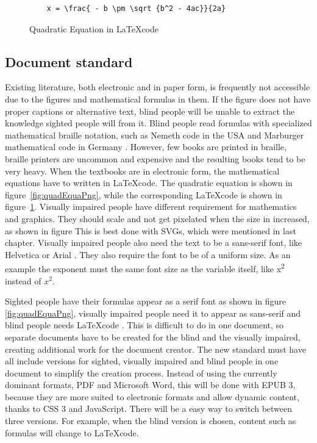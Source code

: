 \begin{figure}
	\begin{lstlisting}
	x = \frac{ - b \pm \sqrt {b^2 - 4ac}}{2a}
	\end{lstlisting}
	\caption{Quadratic Equation in \LaTeX code}
	\label{fig:quadEquaLatex}
\end{figure}


\subsection{Document standard}
Existing literature, both electronic and in paper form, is frequently not accessible due to the figures and mathematical formulas in them. If the figure does not have proper captions or alternative text, blind people will be unable to extract the knowledge sighted people will from it. Blind people read formulas with specialized mathematical braille notation, such as Nemeth code in the USA and Marburger mathematical code in Germany \cite{augenbitWiki}. However, few books are printed in braille, braille printers are uncommon and expensive and the resulting books tend to be very heavy. When the textbooks are in electronic form, the mathematical equations have to written in \LaTeX code. The quadratic equation is shown in figure~\ref{fig:quadEquaPng}, while the corresponding \LaTeX code is shown in figure~\ref{fig:quadEquaLatex}. Visually impaired people have different requirement for mathematics and graphics. They should scale and not get pixelated when the size in increased, as shown in figure This is best done with SVGs, which were mentioned in last chapter. Visually impaired people also need the text to be a sans-serif font, like Helvetica or Arial \cite{pdfBarrierefrei}. They also require the font to be of a uniform size. As an example the exponent must the same font size as the variable itself, like x\textsuperscript{{\normalsize{2}}} instead of $x^{2}$. 


Sighted people have their formulas appear as a serif font as shown in figure \ref{fig:quadEquaPng}, visually impaired people need it to appear as sans-serif and blind people needs \LaTeX code \cite{augenbitWiki}. This is difficult to do in one document, so separate documents have to be created for the blind and the visually impaired, creating additional work for the document creator. The new standard must have all include versions for sighted, visually impaired and blind people in one document to simplify the creation process. Instead of using the currently dominant formats, PDF and Microsoft Word, this will be done with EPUB 3, because they are more suited to electronic formats and allow dynamic content, thanks to CSS 3 and JavaScript. There will be a easy way to switch between three versions. For example, when the blind version is chosen, content such as formulas will change to \LaTeX code.

